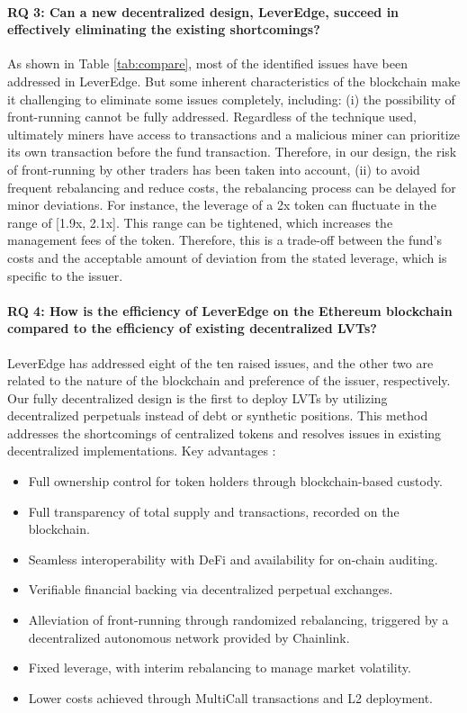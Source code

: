\paragraph{RQ 3: Can a new decentralized design, LeverEdge, succeed in effectively eliminating the existing shortcomings?} As shown in Table \ref{tab:compare}, most of the identified issues have been addressed in LeverEdge. But some inherent characteristics of the blockchain make it challenging to eliminate some issues completely, including: (i) the possibility of front-running cannot be fully addressed. Regardless of the technique used, ultimately miners have access to transactions and a malicious miner can prioritize its own transaction before the fund transaction. Therefore, in our design, the risk of front-running by other traders has been taken into account, (ii) to avoid frequent rebalancing and reduce costs, the rebalancing process can be delayed for minor deviations. For instance, the leverage of a 2x token can fluctuate in the range of [1.9x, 2.1x]. This range can be tightened, which increases the management fees of the token. Therefore, this is a trade-off between the fund's costs and the acceptable amount of deviation from the stated leverage, which is specific to the issuer.
	
\paragraph{RQ 4: How is the efficiency of LeverEdge on the Ethereum blockchain compared to the efficiency of existing decentralized LVTs?}  LeverEdge has addressed eight of the ten raised issues, and the other two are related to the nature of the blockchain and preference of the issuer, respectively. Our fully decentralized design is the first to deploy LVTs by utilizing decentralized perpetuals instead of debt or synthetic positions. This method addresses the shortcomings of centralized tokens and resolves issues in existing decentralized implementations. Key advantages :
\begin{itemize}
	\item Full ownership control for token holders through blockchain-based custody.
	\item Full transparency of total supply and transactions, recorded on the blockchain.
	\item Seamless interoperability with DeFi and availability for on-chain auditing.
	\item Verifiable financial backing via decentralized perpetual exchanges.
	\item Alleviation of front-running through randomized rebalancing, triggered by a decentralized autonomous network provided by Chainlink.
	\item Fixed leverage, with interim rebalancing to manage market volatility.
	\item Lower costs achieved through MultiCall transactions and L2 deployment.
\end{itemize}

